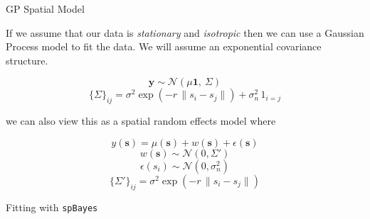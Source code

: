 \documentclass[11pt,ignorenonframetext,]{beamer}
\newenvironment{Shaded}{}{}
\newcommand{\KeywordTok}[1]{\textcolor[rgb]{0.00,0.44,0.13}{\textbf{#1}}}
\newcommand{\DataTypeTok}[1]{\textcolor[rgb]{0.56,0.13,0.00}{#1}}
\newcommand{\DecValTok}[1]{\textcolor[rgb]{0.25,0.63,0.44}{#1}}
\newcommand{\FloatTok}[1]{\textcolor[rgb]{0.25,0.63,0.44}{#1}}
\newcommand{\StringTok}[1]{\textcolor[rgb]{0.25,0.44,0.63}{#1}}
\newcommand{\OperatorTok}[1]{\textcolor[rgb]{0.40,0.40,0.40}{#1}}
\newcommand{\NormalTok}[1]{#1}
\let\oldShaded\Shaded
\let\endoldShaded\endShaded
\renewenvironment{Shaded}{\footnotesize\begin{spacing}{0.9}\oldShaded}{\endoldShaded\end{spacing}}
\begin{document}
\begin{frame}{GP Spatial Model}

\small

If we assume that our data is \emph{stationary} and \emph{isotropic}
then we can use a Gaussian Process model to fit the data. We will assume
an exponential covariance structure.

\[ \bm{y} \sim \mathcal{N}(\mu\bm{1},~\Sigma) \]
\[ \{\Sigma\}_{ij} = \sigma^2 \exp(- r \, \lVert s_i - s_j\lVert) + \sigma^2_n \, 1_{i=j} \]

\pause

we can also view this as a spatial random effects model where

\[ y(\bm{s}) = \mu(\bm{s}) + w(\bm{s}) + \epsilon(\bm{s}) \]
\[ w(\bm{s}) \sim \mathcal{N}(0,\Sigma') \]
\[ \epsilon(s_i) \sim \mathcal{N}(0,\sigma^2_n) \]
\[ \{\Sigma'\}_{ij} = \sigma^2 \exp(- r \, \lVert s_i - s_j\lVert) \]

\end{frame}

\begin{frame}[fragile]{Fitting with \texttt{spBayes}}

\begin{Shaded}
\end{Shaded}

\end{frame}
\end{document}
